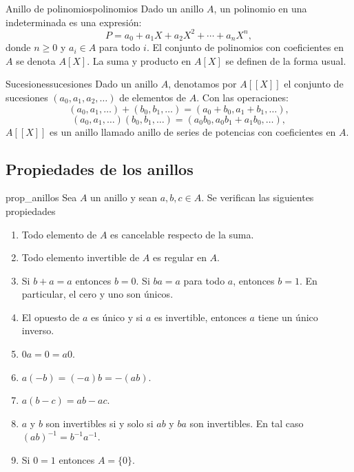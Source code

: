 \begin{example}{Anillo de polinomios}{polinomios}
    Dado un anillo \( A \), un polinomio en una indeterminada es una expresión:
    \[
    P = a_0 + a_1 X + a_2 X^2 + \cdots + a_n X^n,
    \]
    donde \( n \geq 0 \) y \( a_i \in A \) para todo \( i \). El conjunto de polinomios con coeficientes en \( A \) se denota \( A[X] \). La suma y producto en \( A[X] \) se definen de la forma usual.
\end{example}

\begin{example}{Sucesiones}{sucesiones}
    Dado un anillo \( A \), denotamos por \( A[[X]] \) el conjunto de sucesiones \((a_0, a_1, a_2, \ldots)\) de elementos de \( A \). Con las operaciones:
    \[
    (a_0, a_1, \ldots) + (b_0, b_1, \ldots) = (a_0 + b_0, a_1 + b_1, \ldots),
    \]
    \[
    (a_0, a_1, \ldots)(b_0, b_1, \ldots) = (a_0 b_0, a_0 b_1 + a_1 b_0, \ldots),
    \]
    \( A[[X]] \) es un anillo llamado anillo de series de potencias con coeficientes en \( A \).
\end{example}

\subsection{Propiedades de los anillos}

\begin{lemma}{}{prop_anillos}
    Sea $A$ un anillo y sean $a,b,c \in A$. Se verifican las siguientes propiedades
    \begin{enumerate}
        \item Todo elemento de $A$ es cancelable respecto de la suma.
        \item Todo elemento invertible de $A$ es regular en $A$.
        \item Si $b + a = a$ entonces $b=0$. Si $ba=a$ para todo $a$, entonces $b=1$. En particular, el cero y uno son únicos.
        \item El opuesto de $a$ es único y si $a$ es invertible, entonces $a$ tiene un único inverso.
        \item $0a=0=a0$.
        \item $a(-b)=(-a)b=-(ab)$.
        \item $a(b-c)=ab-ac$.
        \item $a$ y $b$ son invertibles si y solo si $ab$ y $ba$ son invertibles. En tal caso $(ab)^{-1}=b^{-1}a^{-1}$.
        \item Si $0=1$ entonces $A=\{0\}$.
    \end{enumerate}
\end{lemma}

